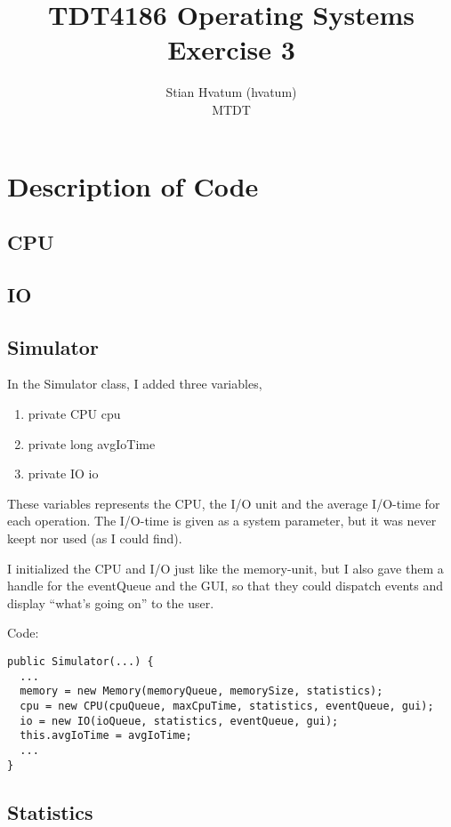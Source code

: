 \documentclass[norsk,a4paper]{article}
\title{TDT4186 Operating Systems\\
{\Huge Exercise 3}}
\author{Stian Hvatum (hvatum)\\MTDT}
\begin{document}
\maketitle
\thispagestyle{empty}
\newpage
{}
\tableofcontents
\newpage
{}
\section{Description of Code}
\subsection{CPU}

\subsection{IO}

\subsection{Simulator}
In the Simulator class, I added three variables,
\begin{enumerate}
     \item private CPU cpu 
     \item private long avgIoTime 
     \item private IO io 
\end{enumerate}

These variables represents the CPU, the I/O unit and the average I/O-time for
each operation. The I/O-time is given as a system parameter, but it was never
keept nor used (as I could find).

I initialized the CPU and I/O just like the memory-unit, but I also gave them a
handle for the eventQueue and the GUI, so that they could dispatch events and
display ``what's going on'' to the user.

Code:
\lstset{language=java}
\begin{lstlisting}
public Simulator(...) {
  ...
  memory = new Memory(memoryQueue, memorySize, statistics);
  cpu = new CPU(cpuQueue, maxCpuTime, statistics, eventQueue, gui);
  io = new IO(ioQueue, statistics, eventQueue, gui);
  this.avgIoTime = avgIoTime;
  ...
}
\end{lstlisting}

\subsection{Statistics}
\end{document}
